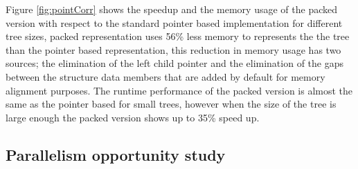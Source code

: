 \documentclass[a4paper,english]{lipics-v2016}
\begin{document}
  
Figure \ref{fig:pointCorr} shows the speedup and the memory usage of the  packed version  with respect to the standard pointer based implementation for different tree sizes,
packed representation uses 56\% less memory to represents the the tree than the pointer based representation, this reduction in memory usage has two sources;
the elimination of the left child pointer and the elimination of the gaps between the structure data members that are added by default for memory alignment purposes.
The runtime performance of the packed version is almost the same as the pointer based for small trees, however when the size of the tree is large enough the packed version 
shows up to 35\% speed up.



\subsection{Parallelism opportunity study}


\end{document}
